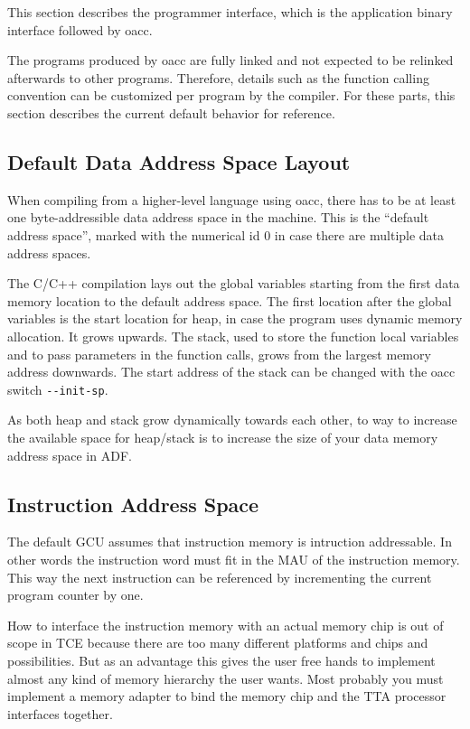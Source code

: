 \documentclass[a4paper,twoside]{tceusermanual}
\begin{document}
This section describes the programmer interface, which is 
the application binary interface followed by oacc.

The programs produced by oacc are fully linked and not expected
to be relinked afterwards to other programs. Therefore, details 
such as the function calling convention can be customized per program by 
the compiler. For these parts, this section describes the current 
default behavior for reference.

\subsection{Default Data Address Space Layout}
\label{ssec:address-spaces-of-umach}

When compiling from a higher-level language using oacc, there 
has to be at least one byte-addressible data address space in the machine. 
This is the ``default address space'', marked with the numerical 
id 0 in case there are multiple data address spaces. 

The C/C++ compilation lays out the global variables starting from the 
first data memory location to the default address space. The first 
location after the global variables is the start location for heap, 
in case the program uses dynamic memory allocation. It grows upwards. 
The stack, used to store the function local variables and to pass 
parameters in the function calls, grows from the largest memory address 
downwards. The start address of the stack can be changed with the oacc 
switch \verb|--init-sp|.

As both heap and stack grow dynamically towards each other, to way to
increase the available space for heap/stack is to 
increase the size of your data memory address space in ADF. 

\subsection{Instruction Address Space}

The default GCU assumes that instruction memory is intruction addressable. In
other words the instruction word must fit in the MAU of the instruction
memory. This way the next instruction can be referenced by incrementing the
current program counter by one.

How to interface the instruction memory with an actual memory chip is out of
scope in TCE because there are too many different platforms and chips and
possibilities. But as an advantage this gives the user free hands to
implement almost any kind of memory hierarchy the user wants. Most probably
you must implement a memory adapter to bind the memory chip and the TTA
processor interfaces together.
\end{document}
